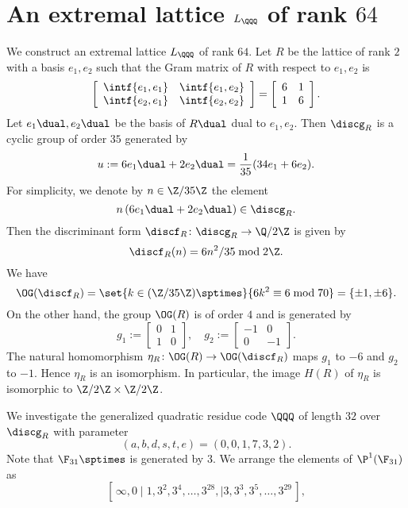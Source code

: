 \documentclass{amsart}
\begin{document}
\section{An extremal lattice $L_{\QQQ}$  of rank  $64$}\label{sec:64}
%
We construct an extremal lattice $L_{\QQQ}$ of rank $64$.
Let $R$ be the lattice of rank $2$ with  a basis $e_1, e_2$
such that the Gram matrix of $R$ with respect to $e_1, e_2$ is
%
\begin{equation}\label{eq:GramR}
\left[\begin{array}{cc} \intf{e_1, e_1} & \intf{e_1, e_2} \\ \intf{e_2, e_1} & \intf{e_2, e_2}\end{array}\right]
=\left[\begin{array}{cc} 6 & 1 \\ 1 & 6 \end{array}\right].
\end{equation}
%
Let $e_1\dual, e_2\dual$  be the basis of  $R\dual$
dual to $e_1, e_2$.
Then $\discg_R$ is a cyclic group of order $35$ generated by
$$
u:=6 e_1\dual+2 e_2\dual=\frac{1}{35}(34 e_1+ 6 e_2).
$$
For simplicity, we denote by $n\in \Z/35\Z$ the element 
$$
n\,(6 e_1\dual+2 e_2\dual)\in \discg_R.
$$
Then the discriminant form $\discf_R\colon \discg_R\to \Q/2\Z$ is given by
$$
\discf_R(n)=6 n^2/35 \bmod 2\Z.
$$
We have
$$
\OG(\discf_R)=\set{k\in (\Z/35\Z)\sptimes}{6 k^2\equiv 6 \bmod 70}=\{\pm 1, \pm 6\}.
$$
On the other hand, the group $\OG(R)$ is of order $4$ and is 
generated by
$$
g_1:=\left[\begin{array}{cc} 0 & 1 \\ 1 & 0 \end{array}\right],
\quad
g_2:=\left[\begin{array}{cc} -1 & 0 \\ 0 & -1 \end{array}\right].
$$
The natural homomorphism $\eta_R\colon \OG(R)\to \OG(\discf_R)$
maps $g_1$ to $-6$ and $g_2$ to $-1$.
Hence $\eta_R$ is an isomorphism.
In particular, the image $H(R)$ of $\eta_R$ is isomorphic to $\Z/2\Z\times \Z/2\Z$.
%
\par
\medskip
We investigate 
the generalized quadratic residue code $\QQQ$ of length $32$ over $\discg_R$
with parameter 
$$
(a,b,d,s,t,e)=(0, 0, 1, 7, 3, 2).
$$
Note that  $\F_{31}\sptimes$ is generated by $3$.
We arrange the elements of $\P^1(\F_{31})$ as
%
\begin{equation}\label{eq:sortP1}
[\, \infty, 0 \mid 1, 3^2, 3^4, \dots, 3^{28}, \mid 3, 3^3,3^5,  \dots, 3^{29}\,],
\end{equation}
\end{document}
